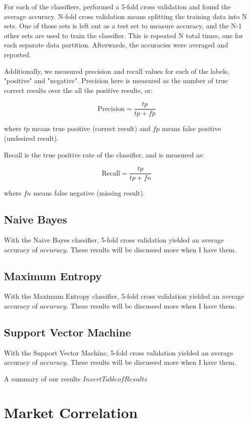 \documentclass[preprint,pre,floats,aps,amsmath,amssymb,12pt]{revtex4}
\begin{document}
For each of the classifiers, performed a 5-fold cross validation and found the average accuracy. N-fold cross validation means splitting the training data into N sets. One of those sets is left out as a test set to measure accuracy, and the N-1 other sets are used to train the classifier. This is repeated N total times, one for each separate data partition. Afterwards, the accuracies were averaged and reported. 

Additionally, we measured precision and recall values for each of the labels, "positive" and "negative". Precision here is measured as the number of true correct results over the all the positive results, or: 

\[\text{Precision} = \frac{tp}{tp + fp}\]

where $tp$ means true positive (correct result) and $fp$ means false positive (undesired result).

Recall is the true positive rate of the classifier, and is measured as:

\[\text{Recall} = \frac{tp}{tp + fn}\]

where $fn$ means false negative (missing result).


\subsection{Naive Bayes}

With the Naive Bayes classifier, 5-fold cross validation yielded an average accuracy of $accuracy$. These results will be discussed more when I have them.

\subsection{Maximum Entropy}


With the Maximum Entropy classifier, 5-fold cross validation yielded an average accuracy of $accuracy$. These results will be discussed more when I have them.


\subsection{Support Vector Machine}


With the Support Vector Machine, 5-fold cross validation yielded an average accuracy of $accuracy$. These results will be discussed more when I have them.

A summary of our results $Insert Table of Results$

 
\section{Market Correlation}
\label{sec:corr}
\end{document}
